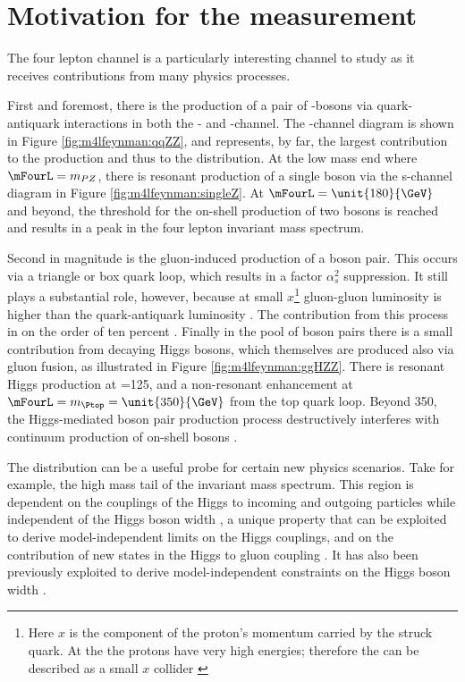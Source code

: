 \section{Motivation for the \mFourL measurement}
\label{sec:fourlepmotivation}

The four lepton channel is a particularly interesting channel to study as it receives contributions from many physics processes.  

First and foremost, there is the production of a pair of \PZ-bosons via quark-antiquark interactions in  both the \Ptop- and \Pup-channel. The \Ptop-channel diagram is shown in Figure \ref{fig:m4lfeynman:qqZZ}, and represents, by far,  the largest contribution to the \ZZ production and thus to the \mFourL distribution. At the low mass end where $\mFourL=m_{PZ}$, there is resonant production of a single \PZ boson via the s-channel diagram in Figure \ref{fig:m4lfeynman:singleZ}. At $\mFourL=\unit{180}{\GeV}$ and beyond, the threshold for the on-shell production of two \PZ bosons is reached and results in a peak in the four lepton invariant mass spectrum. 

Second in magnitude is the gluon-induced production of a \PZ boson pair. This occurs via a triangle or box quark loop, which results in a factor $\alpha_s^2$ suppression. It still plays a substantial role, however, because at small $x$\footnote{Here $x$ is the component of the proton's momentum carried by the struck quark. At the \LHC the protons have very high energies; therefore the \LHC can be described as a small $x$ collider \cite{zotov2012small}} gluon-gluon luminosity is higher than the quark-antiquark luminosity \cite{Glover:194539}. The contribution from this process in on the order of ten percent \cite{Becker:2230817}. Finally in the pool of \PZ boson pairs there is a small contribution from decaying Higgs bosons, which themselves are produced also via gluon fusion, as illustrated in Figure \ref{fig:m4lfeynman:ggHZZ}. There is resonant Higgs production at \mFourL=\unit{125}{\GeV}, and a non-resonant enhancement at $\mFourL=m_{\Ptop}=\unit{350}{\GeV}$ from the top quark loop. Beyond \unit{350}{\GeV}, the Higgs-mediated \PZ boson pair production process destructively interferes with continuum production of on-shell \PZ bosons \cite{Campbell_2016}.

The \mFourL distribution can be a useful probe for certain new physics scenarios. Take for example, the high mass tail of the invariant mass spectrum. This region is dependent on the couplings of the Higgs to incoming and outgoing particles while independent of the Higgs boson width \cite{Campbell_2016}, a unique property that can be exploited to derive model-independent limits on the Higgs couplings, and on the  contribution of new states in the Higgs to gluon coupling \cite{Cacciapaglia_2014}. It has also been previously exploited to derive model-independent constraints on the Higgs boson width \cite{Caola_2013}. 

